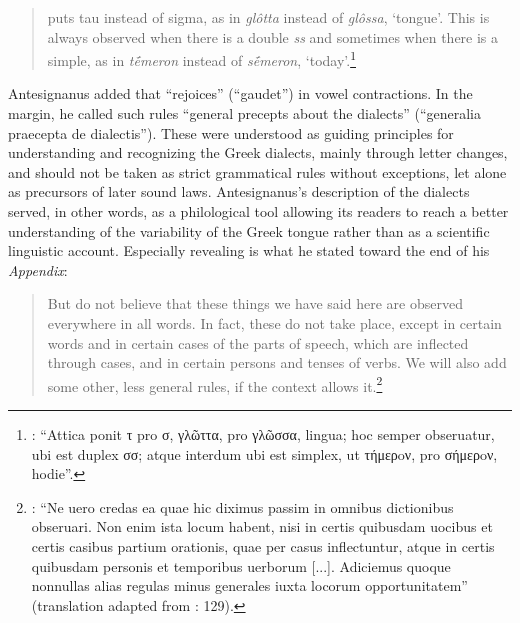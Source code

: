 \begin{quote}
 puts tau instead of sigma, as in \textit{glôtta} instead of \textit{glôssa}, `tongue'. This is always observed when there is a double \textit{ss} and sometimes when there is a simple, as in \textit{tḗmeron} instead of \textit{sḗmeron}, `today'.\footnote{{\citet[13]{Antesignanus1554}: “Attica ponit τ pro σ, γλῶττα, pro γλῶσσα, lingua; hoc semper obseruatur, ubi est duplex σσ; atque interdum ubi est simplex, ut τήμερoν, pro σήμερoν, hodie”.}}
\end{quote}

Antesignanus added that  “rejoices” (“gaudet”) in vowel contractions. In the margin, he called such rules “general precepts about the dialects” (“generalia praecepta de dialectis”). These were understood as guiding principles for understanding and recognizing the Greek dialects, mainly through letter changes, and should not be taken as strict grammatical rules without exceptions, let alone as precursors of later sound laws. Antesignanus’s description of the dialects served, in other words, as a philological tool allowing its readers to reach a better understanding of the variability of the Greek tongue rather than as a scientific linguistic account. Especially revealing is what he stated toward the end of his \textit{Appendix}:

\begin{quote}
But do not believe that these things we have said here are observed everywhere in all words. In fact, these do not take place, except in certain words and in certain cases of the parts of speech, which are inflected through cases, and in certain persons and tenses of verbs. We will also add some other, less general rules, if the context allows it.\footnote{{\citet[15]{Antesignanus1554}: “Ne uero credas ea quae hic diximus passim in omnibus dictionibus obseruari. Non enim ista locum habent, nisi in certis quibusdam uocibus et certis casibus partium orationis, quae per casus inflectuntur, atque in certis quibusdam personis et temporibus uerborum [...]. Adiciemus quoque nonnullas alias regulas minus generales iuxta locorum opportunitatem” (translation adapted from \citealt{VanRooy2016c}: 129).}}
\end{quote}

